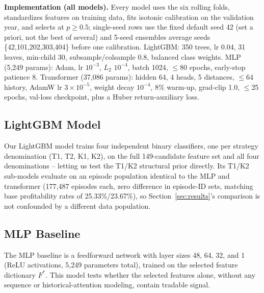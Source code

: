 \documentclass[sigconf,review]{acmart}
\begin{document}
\noindent\textbf{Implementation (all models).} Every model uses the six rolling folds, standardizes features on training data, fits isotonic calibration on the validation year, and selects at $p\ge0.5$; single-seed rows use the fixed default seed 42 (set a priori, not the best of several) and 5-seed ensembles average seeds \{42,101,202,303,404\} before one calibration. LightGBM: 350 trees, lr 0.04, 31 leaves, min-child 30, subsample/colsample 0.8, balanced class weights. MLP (5{,}249 params): Adam, lr $10^{-3}$, $L_2$ $10^{-4}$, batch 1024, $\le$80 epochs, early-stop patience 8. Transformer (37{,}086 params): hidden 64, 4 heads, 5 distances, $\le$64 history, AdamW lr $3{\times}10^{-5}$, weight decay $10^{-4}$, 8\% warm-up, grad-clip 1.0, $\le$25 epochs, val-loss checkpoint, plus a Huber return-auxiliary loss.

\subsection{LightGBM Model}
\label{sec:lgbm-scope}
Our LightGBM model trains four independent binary classifiers, one per strategy denomination (T1, T2, K1, K2), on the full 149-candidate feature set and all four denominations -- letting us test the T1/K2 structural prior directly. Its T1/K2 sub-models evaluate on an episode population identical to the MLP and transformer (177{,}487 episodes each, zero difference in episode-ID sets, matching base profitability rates of 25.33\%/23.67\%), so Section~\ref{sec:results}'s comparison is not confounded by a different data population.

\subsection{MLP Baseline}
The MLP baseline is a feedforward network with layer sizes 48, 64, 32, and 1 (ReLU activations, 5{,}249 parameters total), trained on the selected feature dictionary $F^{\ast}$. This model tests whether the selected features alone, without any sequence or historical-attention modeling, contain tradable signal.
\end{document}
